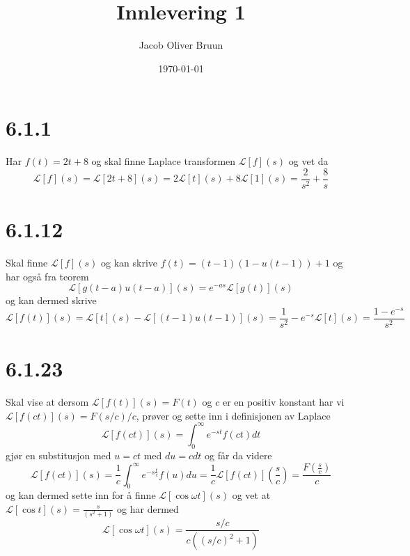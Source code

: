 \documentclass{report}
\title{Innlevering 1}
\author{Jacob Oliver Bruun}
\date{\today}
\newcommand{\nbrack}[1]{\left( #1 \right)}
\newcommand{\bbrack}[1]{\left[ #1 \right]}
\newcommand{\Lplc}[1]{\mathscr{L}\bbrack{ #1 } (s)}
\begin{document}
\section*{6.1.1}
Har $f(t) = 2t + 8$ og skal finne Laplace transformen $\Lplc{f}$ og vet da
\begin{equation}
  \label{eq:1}
  \Lplc{f} = \Lplc{2t + 8} = 2\Lplc{t} + 8\Lplc{1} = \frac{2}{s^{2}} + \frac{8}{s}
\end{equation}


\section*{6.1.12}
Skal finne $\Lplc{f}$ og kan skrive $f(t) = \nbrack{t-1} \nbrack{1-u(t-1)} + 1$ og har også fra teorem
\begin{equation}
  \label{eq:2}
  \Lplc{g(t-a)u(t-a)} = e^{-as} \Lplc{g(t)}
\end{equation}
og kan dermed skrive
\begin{equation}
  \label{eq:3}
  \Lplc{f(t)} = \Lplc{t} - \Lplc{(t-1) u(t-1)} = \frac{1}{s^{2}} - e^{-s} \Lplc{t} = \frac{1-e^{-s}}{s^{2}}
\end{equation}


\section*{6.1.23}
Skal vise at dersom $\Lplc{f(t)} = F(t)$ og $c$ er en positiv konstant har vi $\Lplc{f(ct)} = F(s/c)/c$, prøver og sette inn i definisjonen av Laplace
\begin{equation}
  \label{eq:4}
  \Lplc{f(ct)} = \int_{0}^{\infty} e^{-st} f(ct) dt
\end{equation}
gjør en substitusjon med $u = ct$ med $du = cdt$ og får da videre
\begin{equation}
  \label{eq:5}
  \Lplc{f(ct)} = \frac{1}{c}\int_{0}^{\infty} e^{-s\frac{t}{c}} f(u) du = \frac{1}{c} \mathscr{L} [f(ct)]\nbrack{\frac{s}{c}} = \frac{F\nbrack{\frac{s}{c}}}{c}
\end{equation}
og kan dermed sette inn for å finne $\Lplc{\cos \omega t}$ og vet at $\Lplc{\cos t} = \frac{s}{\nbrack{s^{2} + 1}}$ og har dermed
\begin{equation}
  \label{eq:6}
  \Lplc{\cos \omega t} = \frac{s/c}{c \nbrack{\nbrack{s/c}^{2} + 1}}
\end{equation}
\end{document}
